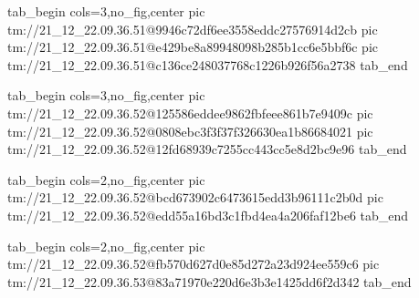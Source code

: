 \ifcmt
  tab_begin cols=3,no_fig,center
    pic tm://21_12_22.09.36.51@9946c72df6ee3558eddc27576914d2cb
    pic tm://21_12_22.09.36.51@e429be8a89948098b285b1cc6e5bbf6c
    pic tm://21_12_22.09.36.51@c136ce248037768c1226b926f56a2738
  tab_end
\fi


\ifcmt
  tab_begin cols=3,no_fig,center
    pic tm://21_12_22.09.36.52@125586eddee9862fbfeee861b7e9409c
    pic tm://21_12_22.09.36.52@0808ebc3f3f37f326630ea1b86684021
    pic tm://21_12_22.09.36.52@12fd68939c7255cc443cc5e8d2bc9e96
  tab_end
\fi


\ifcmt
  tab_begin cols=2,no_fig,center
    pic tm://21_12_22.09.36.52@bcd673902c6473615edd3b96111c2b0d
    pic tm://21_12_22.09.36.52@edd55a16bd3c1fbd4ea4a206faf12be6
  tab_end
\fi


\ifcmt
  tab_begin cols=2,no_fig,center
    pic tm://21_12_22.09.36.52@fb570d627d0e85d272a23d924ee559c6
    pic tm://21_12_22.09.36.53@83a71970e220d6e3b3e1425dd6f2d342
  tab_end
\fi

